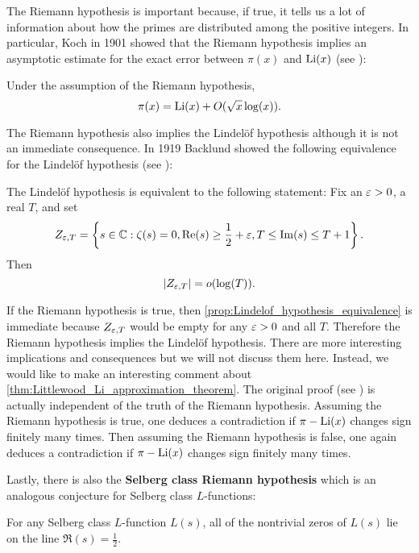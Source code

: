       The Riemann hypothesis is important because, if true, it tells us a lot of information about how the primes are distributed among the positive integers. In particular, Koch in 1901 showed that the Riemann hypothesis implies an asymptotic estimate for the exact error between $\pi(x)$ and $\operatorname{\mathrm{Li}}(x)$ (see \cite{von1901distribution}):

      \begin{proposition}
        Under the assumption of the Riemann hypothesis,
        \[
          \pi(x) = \operatorname{\mathrm{Li}}(x)+O(\sqrt{x}\log(x)).
        \]
      \end{proposition}

      The Riemann hypothesis also implies the Lindel\"of hypothesis although it is not an immediate consequence. In 1919 Backlund showed the following equivalence for the Lindel\"of hypothesis (see \cite{backlund1919beziehung}):

      \begin{proposition}\label{prop:Lindelof_hypothesis_equivalence}
      The Lindel\"of hypothesis is equivalent to the following statement: Fix an $\varepsilon > 0$, a real $T$, and set
      \[
        Z_{\varepsilon,T} = \left\{s \in \mathbb{C} : \zeta(s) = 0, \mathrm{Re}(s) \ge \frac{1}{2}+\varepsilon, T \le \mathrm{Im}(s) \le T+1 \right\}.
      \]
      Then
      \[
        |Z_{\varepsilon,T}| = o(\log(T)).
      \]
      \end{proposition}

      If the Riemann hypothesis is true, then \cref{prop:Lindelof_hypothesis_equivalence} is immediate because $Z_{\varepsilon,T}$ would be empty for any $\varepsilon > 0$ and all $T$. Therefore the Riemann hypothesis implies the Lindel\"of hypothesis. There are more interesting implications and consequences but we will not discuss them here. Instead, we would like to make an interesting comment about \cref{thm:Littlewood_Li_approximation_theorem}. The original proof (see \cite{hardy1916contributions}) is actually independent of the truth of the Riemann hypothesis. Assuming the Riemann hypothesis is true, one deduces a contradiction if $\pi-\operatorname{\mathrm{Li}}(x)$ changes sign finitely many times. Then assuming the Riemann hypothesis is false, one again deduces a contradiction if $\pi-\operatorname{\mathrm{Li}}(x)$ changes sign finitely many times.

      Lastly, there is also the \textbf{Selberg class Riemann hypothesis} which is an analogous conjecture for Selberg class $L$-functions:

      \begin{conjecture}
        For any Selberg class $L$-function $L(s)$, all of the nontrivial zeros of $L(s)$ lie on the line $\Re(s) = \frac{1}{2}$.
      \end{conjecture}

